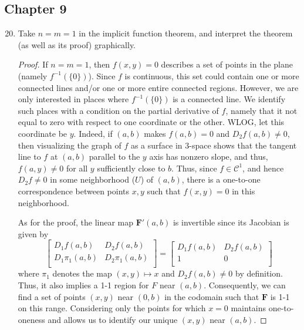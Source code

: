 \documentclass[../psets.tex]{subfiles}
\begin{document}
\subsection*{Chapter 9}
\begin{enumerate}[label={\textbf{\arabic*.}}]
    \setcounter{enumi}{19}
    \item Take $n=m=1$ in the implicit function theorem, and interpret the theorem (as well as its proof) graphically.
    \begin{proof}
        If $n=m=1$, then $f(x,y)=0$ describes a set of points in the plane (namely $f^{-1}(\{0\})$). Since $f$ is continuous, this set could contain one or more connected lines and/or one or more entire connected regions. However, we are only interested in places where $f^{-1}(\{0\})$ is a connected line. We identify such places with a condition on the partial derivative of $f$, namely that it not equal to zero with respect to one coordinate or the other. WLOG, let this coordinate be $y$. Indeed, if $(a,b)$ makes $f(a,b)=0$ and $D_2f(a,b)\neq 0$, then visualizing the graph of $f$ as a surface in 3-space shows that the tangent line to $f$ at $(a,b)$ parallel to the $y$ axis has nonzero slope, and thus, $f(a,y)\neq 0$ for all $y$ sufficiently close to $b$. Thus, since $f\in\mathscr{C}^1$, and hence $D_2f\neq 0$ in some neighborhood ($U$) of $(a,b)$, there is a one-to-one correspondence between points $x,y$ such that $f(x,y)=0$ in this neighborhood.\par
        As for the proof, the linear map $\mathbf{F}'(a,b)$ is invertible since its Jacobian is given by
        \begin{equation*}
            \begin{bmatrix}
                D_1f(a,b) & D_2f(a,b)\\
                D_1\pi_1(a,b) & D_2\pi_1(a,b)\\
            \end{bmatrix}
            =
            \begin{bmatrix}
                D_1f(a,b) & D_2f(a,b)\\
                1 & 0\\
            \end{bmatrix}
        \end{equation*}
        where $\pi_1$ denotes the map $(x,y)\mapsto x$ and $D_2f(a,b)\neq 0$ by definition. Thus, it also implies a 1-1 region for $F$ near $(a,b)$. Consequently, we can find a set of points $(x,y)$ near $(0,b)$ in the codomain such that $\mathbf{F}$ is 1-1 on this range. Considering only the points for which $x=0$ maintains one-to-oneness and allows us to identify our unique $(x,y)$ near $(a,b)$.
    \end{proof}
\end{enumerate}
\end{document}

